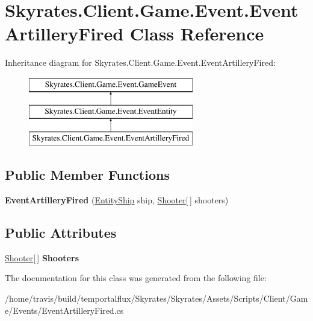 \hypertarget{class_skyrates_1_1_client_1_1_game_1_1_event_1_1_event_artillery_fired}{\section{Skyrates.\-Client.\-Game.\-Event.\-Event\-Artillery\-Fired Class Reference}
\label{class_skyrates_1_1_client_1_1_game_1_1_event_1_1_event_artillery_fired}
}
Inheritance diagram for Skyrates.\-Client.\-Game.\-Event.\-Event\-Artillery\-Fired\-:\begin{figure}[H]
\begin{center}
\leavevmode
\includegraphics[height=3.000000cm]{class_skyrates_1_1_client_1_1_game_1_1_event_1_1_event_artillery_fired}
\end{center}
\end{figure}
\subsection*{Public Member Functions}
\begin{DoxyCompactItemize}
\item 
\hypertarget{class_skyrates_1_1_client_1_1_game_1_1_event_1_1_event_artillery_fired_a24dc075d0ff12e05a7b9d81cf3262758}{{\bfseries Event\-Artillery\-Fired} (\hyperlink{class_skyrates_1_1_common_1_1_entity_1_1_entity_ship}{Entity\-Ship} ship, \hyperlink{class_shooter}{Shooter}\mbox{[}$\,$\mbox{]} shooters)}\label{class_skyrates_1_1_client_1_1_game_1_1_event_1_1_event_artillery_fired_a24dc075d0ff12e05a7b9d81cf3262758}

\end{DoxyCompactItemize}
\subsection*{Public Attributes}
\begin{DoxyCompactItemize}
\item 
\hypertarget{class_skyrates_1_1_client_1_1_game_1_1_event_1_1_event_artillery_fired_a9f5e4a291e93d6611f840341b84a78e6}{\hyperlink{class_shooter}{Shooter}\mbox{[}$\,$\mbox{]} {\bfseries Shooters}}\label{class_skyrates_1_1_client_1_1_game_1_1_event_1_1_event_artillery_fired_a9f5e4a291e93d6611f840341b84a78e6}

\end{DoxyCompactItemize}


The documentation for this class was generated from the following file\-:\begin{DoxyCompactItemize}
\item 
/home/travis/build/temportalflux/\-Skyrates/\-Skyrates/\-Assets/\-Scripts/\-Client/\-Game/\-Events/Event\-Artillery\-Fired.\-cs\end{DoxyCompactItemize}
